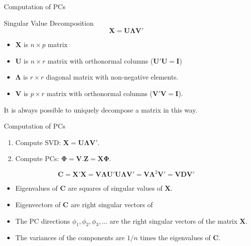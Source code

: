 \documentclass[14pt]{beamer}
\begin{document}
\begin{frame}{Computation of PCs}

\begin{block}{Singular Value Decomposition}
$$\bm{X} = \bm{U}\bm{\Lambda}\bm{V}'$$
\end{block}
\begin{itemize}
\item $\bm{X}$ is $n\times p$ matrix
\item $\bm{U}$ is $n \times r$ matrix with orthonormal columns ($\bm{U}'\bm{U}=\bm{I}$)
\item $\bm{\Lambda}$ is $r \times r$ {diagonal} matrix with non-negative elements.
\item $\bm{V}$ is $p \times r$ matrix with orthonormal columns ($\bm{V}'\bm{V}=\bm{I}$).
\end{itemize}
\begin{block}{}It is always possible to uniquely decompose a matrix in this way.\end{block}

\end{frame}


\begin{frame}{Computation of PCs}

\begin{enumerate}

\item Compute SVD: $\bm{X} = \bm{U}\bm{\Lambda}\bm{V}'$.

\item Compute PCs: $\bm{\Phi} = \bm{V}$.\quad $\bm{Z} = \bm{X}\bm{\Phi}$.
\end{enumerate}\pause


\[
\bm{C} = \bm{X}'\bm{X}
       = \bm{V}\bm{\Lambda}\bm{U}' \bm{U}\bm{\Lambda}\bm{V}'
       = \bm{V}\bm{\Lambda}^2\bm{V}'
       = \bm{V}\bm{D}\bm{V}'
\]\pause\vspace*{-0.7cm}
\begin{itemize}
\item Eigenvalues of $\bm{C}$ are squares of singular values of $\bm{X}$.
\item Eigenvectors of $\bm{C}$ are right singular vectors of 
\item The PC directions $\phi_1,\phi_2,\phi_3,\dots$ are the
right singular vectors of the matrix $\bm{X}$.
\item The variances of the components are $1/n$ times the eigenvalues of $\bm{C}$.
\end{itemize}



\end{frame}
\end{document}
